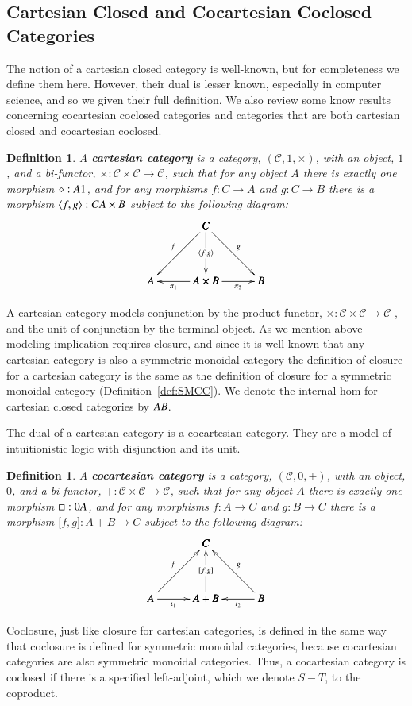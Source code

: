\documentclass{lmcs}
\newtheorem{definition}[theorem]{Definition}
\let\mto\to
\let\to\relax
\newcommand{\to}{\rightarrow}
\newcommand{\cat}[1]{\mathcal{#1}}
\begin{document}
\subsection{Cartesian Closed and Cocartesian Coclosed Categories}
\label{subsec:cartesian_closed_and_cocartesian_coclosed_categories}
The notion of a cartesian closed category is well-known, but for
completeness we define them here.  However, their dual is lesser
known, especially in computer science, and so we given their full
definition.  We also review some know results concerning cocartesian
coclosed categories and categories that are both cartesian closed and
cocartesian coclosed.
\begin{definition}
  \label{def:CC}
  A \textbf{cartesian category} is a category, $(\cat{C}, 1, \times)$,
  with an object, $1$, and a bi-functor, $\times : \cat{C} \times
  \cat{C} \mto \cat{C}$, such that for any object $A$ there is exactly
  one morphism $\diamond : A \to 1$, and for any morphisms $f : C \mto
  A$ and $g : C \mto B$ there is a morphism $\langle f , g \rangle : C
  \to A \times B$ subject to the following diagram:
  \[
  \bfig
  \Atrianglepair/->`->`->`<-`->/[C`A`A\times B`B;
    f`
    \langle f , g \rangle`
    g`
    \pi_1`
    \pi_2]
  \efig
  \]
\end{definition}
A cartesian category models conjunction by the product functor,
$\times : \cat{C} \times \cat{C} \mto \cat{C}$ , and the unit of
conjunction by the terminal object.  As we mention above modeling
implication requires closure, and since it is well-known that any
cartesian category is also a symmetric monoidal category the
definition of closure for a cartesian category is the same as the
definition of closure for a symmetric monoidal category
(Definition~\ref{def:SMCC}).  We denote the internal hom for cartesian
closed categories by $A \to B$.

The dual of a cartesian category is a cocartesian category.  They are
a model of intuitionistic logic with disjunction and its unit.
\begin{definition}
  \label{def:CC}
  A \textbf{cocartesian category} is a category, $(\cat{C}, 0, +)$,
  with an object, $0$, and a bi-functor,
  $+ : \cat{C} \times \cat{C} \mto \cat{C}$, such that for any object $A$ there is exactly
  one morphism $\Box : 0 \to A$, and for any morphisms $f : A \mto C$ and $g : B \mto C$
  there is a morphism $\lbrack f , g \rbrack : A + B \mto C$
  subject to the following diagram:
  \[
  \bfig
  \Atrianglepair/<-`<-`<-`->`<-/[C`A`A+B`B;
    f`
    \lbrack f, g \rbrack`
    g`
    \iota_1`
    \iota_2]
  \efig
  \]  
\end{definition}
Coclosure, just like closure for cartesian categories, is defined in
the same way that coclosure is defined for symmetric monoidal
categories, because cocartesian categories are also symmetric
monoidal categories.  Thus, a cocartesian category is coclosed if
there is a specified left-adjoint, which we denote $S - T$, to the
coproduct.
\end{document}
